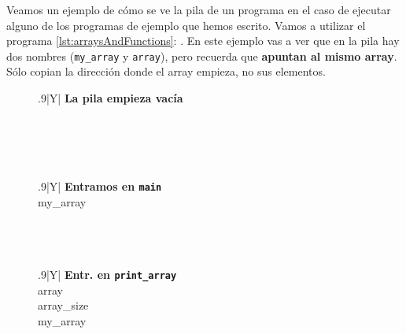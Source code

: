 \documentclass[a4paper]{article}
\begin{document}
Veamos un ejemplo de cómo se ve la pila de un programa en el caso de ejecutar
alguno de los programas de ejemplo que hemos escrito. Vamos a utilizar el
programa \ref{lst:arraysAndFunctions}: .
En este ejemplo vas a ver que en la pila hay dos nombres (\verb!my_array! y
\verb!array!), pero recuerda que \textbf{apuntan al mismo array}. Sólo copian
la dirección donde el array empieza, no sus elementos.
\begin{table}[H]
\centering
    \begin{subfigure}{0.33333\linewidth}
        \centering
        \begin{tabularx}{.9\linewidth}{|Y|}
        \hline
        \textbf{La pila empieza vacía}\\\hline
         \\\hline
        \\ \hline
        \\ \hline
        \\ \hline
        \end{tabularx}
    \end{subfigure}%
    \begin{subfigure}{0.33333\linewidth}
        \centering
        \begin{tabularx}{.9\linewidth}{|Y|}
        \hline
        \textbf{Entramos en \texttt{main}}\\\hline
        my\_array\\\hline
        \\ \hline
        \\ \hline
        \\ \hline
        \end{tabularx}
    \end{subfigure}%
    \begin{subfigure}{0.33333\linewidth}
        \centering
        \begin{tabularx}{.9\linewidth}{|Y|}
        \hline
        \textbf{Entr. en \texttt{print\_array}}\\\hline
        array\\\hline
        array\_size\\\hline
        my\_array\\\hline
        \\ \hline
        \end{tabularx}
    \end{subfigure}%



\end{table}
\end{document}
